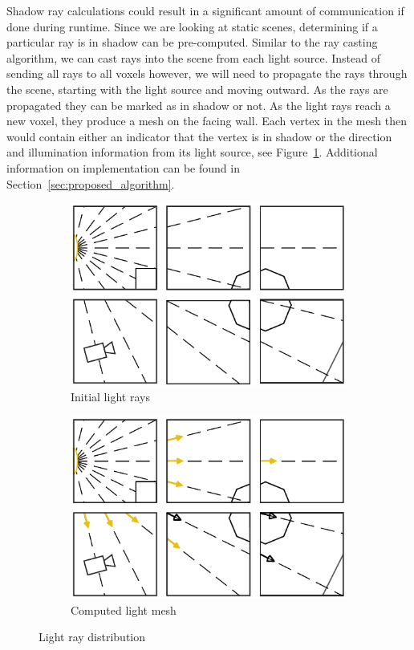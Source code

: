 Shadow ray calculations could result in a significant amount of communication if
done during runtime.  Since we are looking at static scenes, determining if a 
particular ray is in shadow can be pre-computed.  Similar to the ray casting 
algorithm, we can cast rays into the scene from each light source.  Instead of 
sending all rays to all voxels however, we will need to propagate the rays 
through the scene, starting with the light source and moving outward.  As the 
rays are propagated they can be marked as in shadow or not.  As the light rays 
reach a new voxel, they produce a mesh on the facing wall.  Each vertex in the 
mesh then would contain either an indicator that the vertex is in shadow or the 
direction and illumination information from its light source, 
see Figure~\ref{fig:light-distribution}.  Additional information on 
implementation can be found in Section~\ref{sec:proposed_algorithm}.

\begin{figure}[!htb]
\centering
\begin{subfigure}{0.49\textwidth}
 \centering
  \includegraphics[width=.98\columnwidth]{drawings/Lights1.pdf}
  \caption{Initial light rays}
\end{subfigure}
\begin{subfigure}{0.49\textwidth}
 \centering
  \includegraphics[width=.98\columnwidth]{drawings/Lights2.pdf}
  \caption{Computed light mesh}
\end{subfigure}
\caption{Light ray distribution}
\label{fig:light-distribution}
\end{figure}

